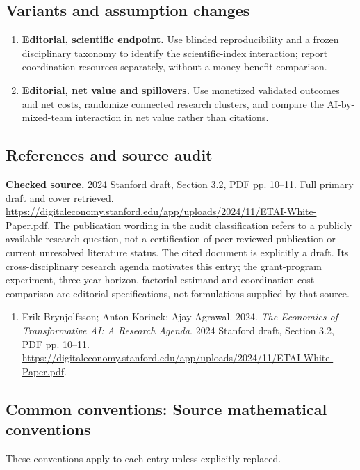 \documentclass[11pt,a4paper]{article}
\begin{document}
\subsection*{Variants and assumption changes}
\begin{enumerate}
\item \textbf{Editorial, scientific endpoint.} Use blinded reproducibility and a frozen disciplinary taxonomy to identify the scientific-index interaction; report coordination resources separately, without a money-benefit comparison.
\item \textbf{Editorial, net value and spillovers.} Use monetized validated outcomes and net costs, randomize connected research clusters, and compare the AI-by-mixed-team interaction in net value rather than citations.
\end{enumerate}
\subsection*{References and source audit}
\textbf{Checked source.} 2024 Stanford draft, Section 3.2, PDF pp. 10--11. Full primary draft and cover retrieved. \url{https://digitaleconomy.stanford.edu/app/uploads/2024/11/ETAI-White-Paper.pdf}.
The publication wording in the audit classification refers to a publicly available research question, not a certification of peer-reviewed publication or current unresolved literature status. The cited document is explicitly a draft. Its cross-disciplinary research agenda motivates this entry; the grant-program experiment, three-year horizon, factorial estimand and coordination-cost comparison are editorial specifications, not formulations supplied by that source.
\begin{enumerate}\raggedright
\item\hypertarget{definitions:source:30007693:1}{} Erik Brynjolfsson; Anton Korinek; Ajay Agrawal. 2024. \emph{The Economics of Transformative AI: A Research Agenda}. 2024 Stanford draft, Section 3.2, PDF pp. 10--11.
\url{https://digitaleconomy.stanford.edu/app/uploads/2024/11/ETAI-White-Paper.pdf}.
\end{enumerate}

\subsection*{Common conventions: Source mathematical conventions}

These conventions apply to each entry unless explicitly replaced.
\end{document}
